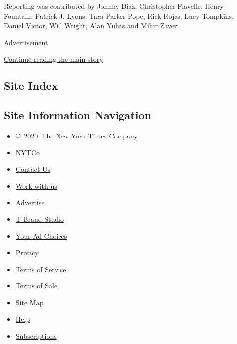 Reporting was contributed by Johnny Diaz, Christopher Flavelle, Henry
Fountain, Patrick J. Lyons, Tara Parker-Pope, Rick Rojas, Lucy Tompkins,
Daniel Victor, Will Wright, Alan Yuhas and Mihir Zaveri

Advertisement

\protect\hyperlink{after-bottom}{Continue reading the main story}

\hypertarget{site-index}{%
\subsection{Site Index}\label{site-index}}

\hypertarget{site-information-navigation}{%
\subsection{Site Information
Navigation}\label{site-information-navigation}}

\begin{itemize}
\tightlist
\item
  \href{https://help.nytimes3xbfgragh.onion/hc/en-us/articles/115014792127-Copyright-notice}{©~2020~The
  New York Times Company}
\end{itemize}

\begin{itemize}
\tightlist
\item
  \href{https://www.nytco.com/}{NYTCo}
\item
  \href{https://help.nytimes3xbfgragh.onion/hc/en-us/articles/115015385887-Contact-Us}{Contact
  Us}
\item
  \href{https://www.nytco.com/careers/}{Work with us}
\item
  \href{https://nytmediakit.com/}{Advertise}
\item
  \href{http://www.tbrandstudio.com/}{T Brand Studio}
\item
  \href{https://www.nytimes3xbfgragh.onion/privacy/cookie-policy\#how-do-i-manage-trackers}{Your
  Ad Choices}
\item
  \href{https://www.nytimes3xbfgragh.onion/privacy}{Privacy}
\item
  \href{https://help.nytimes3xbfgragh.onion/hc/en-us/articles/115014893428-Terms-of-service}{Terms
  of Service}
\item
  \href{https://help.nytimes3xbfgragh.onion/hc/en-us/articles/115014893968-Terms-of-sale}{Terms
  of Sale}
\item
  \href{https://spiderbites.nytimes3xbfgragh.onion}{Site Map}
\item
  \href{https://help.nytimes3xbfgragh.onion/hc/en-us}{Help}
\item
  \href{https://www.nytimes3xbfgragh.onion/subscription?campaignId=37WXW}{Subscriptions}
\end{itemize}
